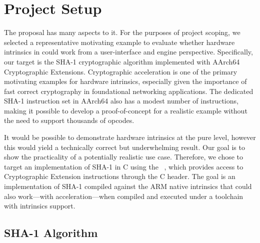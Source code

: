 \section{Project Setup}
\label{sec:setup}

The  proposal has many aspects to it. For the purposes
of project scoping, we selected a representative motivating example to evaluate
whether hardware intrinsics in \wasm could work from a user-interface and engine
perspective. Specifically, our target is the SHA-1 cryptographic algorithm
implemented with AArch64 Cryptographic Extensions. Cryptographic acceleration is
one of the primary motivating examples for hardware intrinsics, especially given
the importance of fast correct cryptography in foundational networking
applications. The dedicated SHA-1 instruction set in AArch64 also has a modest
number of instructions, making it possible to develop a proof-of-concept for a
realistic example without the need to support thousands of opcodes.

It would be possible to demonstrate hardware intrinsics at the pure \wasm level,
however this would yield a technically correct but underwhelming result. Our
goal is to show the practicality of a potentially realistic use case.
Therefore, we chose to target an implementation of SHA-1 in C using the
~\cite{acle}, which provides access to Cryptographic Extension
instructions through the  C header. The goal is an
implementation of SHA-1 compiled against the ARM native intrinsics that could
also work---with acceleration---when compiled and executed under a \wasm toolchain
with intrinsics support.

\subsection{SHA-1 Algorithm}

